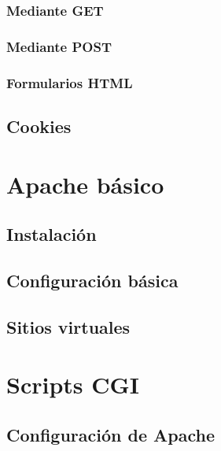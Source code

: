 \documentclass[a4paper,12pt,spanish]{sphinxmanual}
\begin{document}
\subsubsection{Mediante GET}
\label{\detokenize{introduccion:mediante-get}}

\subsubsection{Mediante POST}
\label{\detokenize{introduccion:mediante-post}}

\subsubsection{Formularios HTML}
\label{\detokenize{introduccion:formularios-html}}

\subsection{Cookies}
\label{\detokenize{introduccion:cookies}}

\section{Apache básico}
\label{\detokenize{introduccion:apache-basico}}

\subsection{Instalación}
\label{\detokenize{introduccion:instalacion}}

\subsection{Configuración básica}
\label{\detokenize{introduccion:configuracion-basica}}

\subsection{Sitios virtuales}
\label{\detokenize{introduccion:sitios-virtuales}}

\section{Scripts CGI}
\label{\detokenize{introduccion:scripts-cgi}}

\subsection{Configuración de Apache}
\label{\detokenize{introduccion:configuracion-de-apache}}
\end{document}
